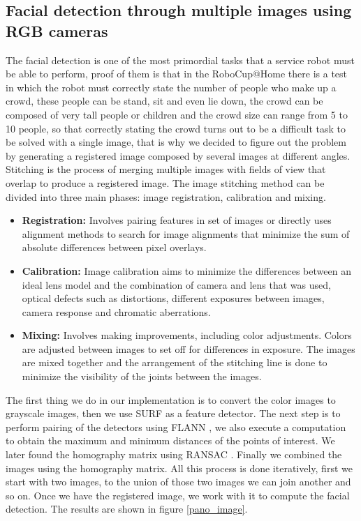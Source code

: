\documentclass{llncs}
\begin{document}
\subsection{Facial detection through multiple images using RGB cameras}\label{subsec:FacialReco}
The facial detection is one of the most primordial tasks that a service robot must be able to perform, proof of them is that in the RoboCup@Home there is a test in which the robot must correctly state the number of people who make up a crowd, these people can  be stand, sit and even lie down, the crowd can be composed of very tall people or children and the crowd size can range from 5 to 10 people, so that correctly stating the crowd turns out to be a difficult task to be solved with a single image, that is why we decided to figure out the problem by generating a registered image composed by several images at different angles. Stitching is the process of merging multiple images with fields of view that overlap to produce a registered image. %
The image stitching method can be divided into three main phases: image registration, calibration and mixing.

\begin{itemize}
	\item \textbf{Registration:} Involves pairing features in set of images or directly uses alignment methods to search for image alignments that minimize the sum of absolute differences between pixel overlays.
	\item \textbf{Calibration:} Image calibration aims to minimize the differences between an ideal lens model and the combination of camera and lens that was used, optical defects such as distortions, different exposures between images, camera response and chromatic aberrations.
	\item \textbf{Mixing:} Involves making improvements, including color adjustments. Colors are adjusted between images to set off for differences in exposure. The images are mixed together and the arrangement of the stitching line is done to minimize the visibility of the joints between the images.
\end{itemize}


The first thing we do in our implementation is to convert the color images to grayscale images, then we use SURF \cite{surf} as a feature detector. The next step is to perform pairing of the detectors using FLANN \cite{flann}, we also execute a computation to obtain the maximum and minimum distances of the points of interest. We later found the homography matrix using RANSAC \cite{ransac}. Finally we combined the images using the homography matrix. All this process is done iteratively, first we start with two images, to the union of those two images we can join another and so on. Once we have the registered image, we work with it to compute the facial detection. The results are shown in figure \ref{pano_image}.
\end{document}
